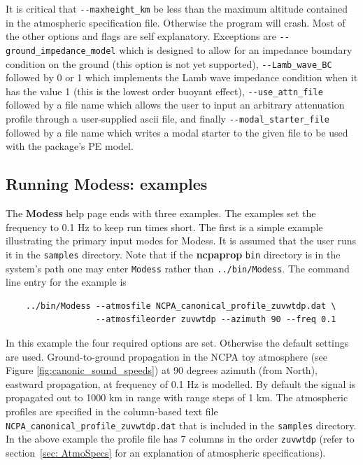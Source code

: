 It is critical that \verb+--maxheight_km+ be less than the maximum altitude contained in the atmospheric specification file. Otherwise the program will crash. Most of the other options and flags are self explanatory. Exceptions are \verb+--ground_impedance_model+ which is designed to allow for an impedance boundary condition on the ground (this option is not yet supported), \verb+--Lamb_wave_BC+ followed by 0 or 1 which implements the Lamb wave impedance condition when it has the value 1 (this is the lowest order buoyant effect), \verb+--use_attn_file+ followed by a file name which allows the user to input an arbitrary attenuation profile through a user-supplied ascii file, and finally \verb+--modal_starter_file+ followed by a file name which writes a modal starter to the given file to be used with the package's PE model. 

\subsection{Running Modess: examples}
\label{sec: modess examples}

The \textbf{Modess} help page ends with three examples. The examples set the frequency to 0.1 Hz to keep run times short. The first is a simple example illustrating the primary input modes for Modess. It is assumed that the user runs it in the \verb+samples+ directory. Note that if the \textbf{ncpaprop} \verb+bin+ directory is in the system's path one may enter \verb+Modess+ rather than \verb+../bin/Modess+. The command line entry for the example is 
\begin{verbatim} 
    ../bin/Modess --atmosfile NCPA_canonical_profile_zuvwtdp.dat \ 
                  --atmosfileorder zuvwtdp --azimuth 90 --freq 0.1
\end{verbatim}
In this example the four required options are set. Otherwise the default settings are used. Ground-to-ground propagation in the NCPA toy atmosphere (see Figure \ref{fig:canonic_sound_speeds}) at 90 degrees azimuth (from North), eastward propagation, at frequency of 0.1 Hz is modelled. By default the signal is propagated out to 1000 km in range with range steps of 1 km. The atmospheric profiles are specified in the column-based text file \verb"NCPA_canonical_profile_zuvwtdp.dat" that is included in the \verb+samples+ directory. In the above example the profile file has 7 columns in the order \verb"zuvwtdp" (refer to section~\ref{sec: AtmoSpecs}  for an explanation of atmospheric specifications).

